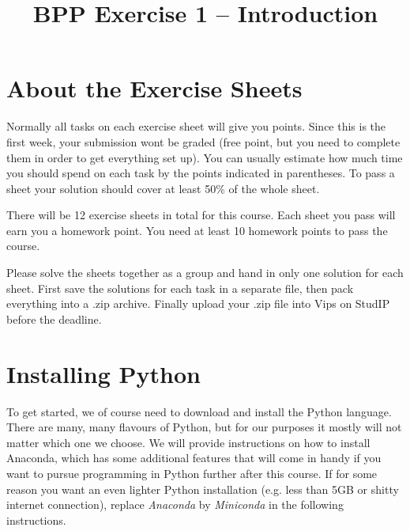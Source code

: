 

\makeatletter
{}
\tw@make@key@macro*{\OS}
\makeatother

\title{BPP Exercise 1 -- Introduction}




\section*{About the Exercise Sheets}

Normally all tasks on each exercise sheet will give you points. Since this is the first week, your submission wont be graded (free point, but you need to complete them in order to get everything set up). You can usually estimate how much time you should spend on each task by the points indicated in parentheses. To pass a sheet your solution should cover at least 50\% of the whole sheet.

\vspace{1em}

\noindent There will be 12 exercise sheets in total for this course. Each sheet you pass will earn you a homework point. You need at least 10 homework points to pass the course.

\vspace{1em}

\noindent Please solve the sheets together as a group and hand in only one solution for each sheet. First save the solutions for each task in a separate file, then pack everything into a .zip archive. Finally upload your .zip file into Vips on StudIP before the deadline.


\section{Installing Python}

To get started, we of course need to download and install the Python language. There are many, many flavours of Python, but for our purposes it mostly will not matter which one we choose. We will provide instructions on how to install Anaconda, which has some additional features that will come in handy if you want to pursue programming in Python further after this course. If for some reason you want an even lighter Python installation (e.g. less than 5GB or shitty internet connection), replace \textit{Anaconda} by \textit{Miniconda} in the following instructions.

